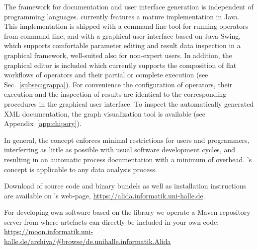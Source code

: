 The framework for documentation and user interface generation is independent of
programming languages.
\alida currently features a mature implementation in Java.
This implementation is shipped with a command line tool for running operators
from command line, and with a graphical user interface based on Java Swing,
which supports comfortable parameter editing and result data inspection in a
graphical framework, well-suited also for non-expert users.
In addition, the graphical editor \grappa is included which currently
supports the composition of flat workflows of operators and their partial or
complete execution (see Sec.~\ref{subsec:grappa}).
For convenience the configuration of operators, their execution and
the inspection of results are identical to the corresponding procedures
in the graphical user interface.
To inspect the automatically generated XML documentation, the graph
visualization tool \mtbc is available (see Appendix~\ref{app:chipory}).

In general, the \alida concept enforces minimal restrictions for users and
programmers, interferring as little as possible with usual software development
cycles, and resulting in an automatic process documentation with a minimum of overhead.
\alida's concept is applicable to any data analysis process. 


Download of source code and binary bundels as well
as installation instructions are available on \alida's web-page, 
\url{https://alida.informatik.uni-halle.de}.

For developing own software based on the \alida library we operate a Maven repository server
from where \alida artefacts can directly be included in your own code:
\url{https://moon.informatik.uni-halle.de/archiva/#browse/de.unihalle.informatik.Alida}
